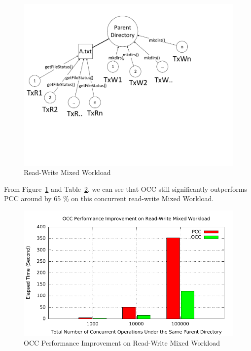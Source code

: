 \begin{figure}[ht]
	\centering
	\includegraphics[scale=0.6]{figs/rw.pdf}
	\caption{Read-Write Mixed Workload}
	\label{fig:rwWorkload}
\end{figure}

\noindent From Figure~\ref{fig:rwWorkload} and Table~\ref{fig:rw}, we can see that OCC still significantly outperforms PCC around by 65 \% on this concurrent read-write Mixed Workload. 

\begin{figure}[ht]
	\centering
	\includegraphics[width=\linewidth]{figs/pcc_occ_rw.pdf}
	\caption{OCC Performance Improvement on Read-Write Mixed Workload}
	\label{fig:rw}
\end{figure}

